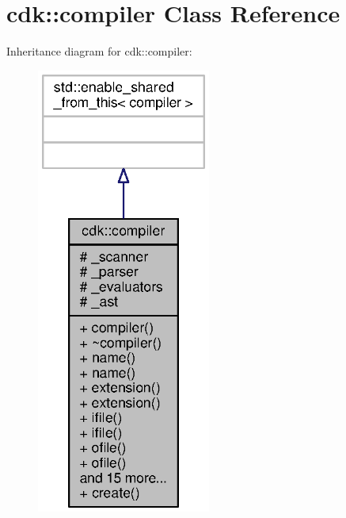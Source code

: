 \section{cdk\+:\+:compiler Class Reference}
\label{classcdk_1_1compiler}


Inheritance diagram for cdk\+:\+:compiler\+:
\nopagebreak
\begin{figure}[H]
\begin{center}
\leavevmode
\includegraphics[width=162pt]{classcdk_1_1compiler__inherit__graph}
\end{center}
\end{figure}



